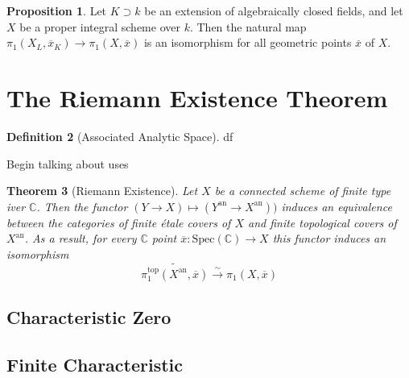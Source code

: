 \documentclass{article}
\newtheorem{theorem}{Theorem}[section]
\theoremstyle{definition}
\newtheorem{proposition}[theorem]{Proposition}
\newtheorem{definition}[theorem]{Definition}
\theoremstyle{remark}
\newcommand{\C}{\mathbb{C}}
\begin{document}
\begin{proposition}
	Let $K \supset k$ be an extension of algebraically closed fields, and let $X$ be a proper integral scheme over $k$.
	Then the natural map $\pi_1(X_L, \overline{x}_K) \to \pi_1(X, \overline{x})$ is an isomorphism for all geometric points $\overline{x}$ of $X$.
\end{proposition} 

\section{The Riemann Existence Theorem}

\begin{definition}[Associated Analytic Space]
	df
\end{definition}

Begin talking about uses


\begin{theorem}[Riemann Existence]
	Let $X$ be a connected scheme of finite type iver $\C$.
	Then the functor $(Y \to X) \mapsto (Y^{\text{an}} \to X^{\text{an}}))$ induces an equivalence between the categories of finite \'etale covers of $X$ and finite topological covers of $X^{\text{an}}$.
	As a result, for every $\C$ point $\overline{x}: \text{Spec}(\C) \to X$ this functor induces an isomorphism
	\[\widetilde{\pi_1^{\text{top}}(X^{\text{an}}, \overline{x})} \xrightarrow{\sim} \pi_1(X, \overline{x})\]

\subsection{Characteristic Zero}

\subsection{Finite Characteristic}
\end{theorem}



\end{document}
